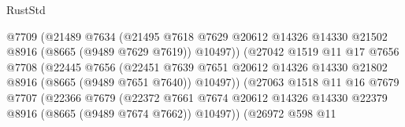 \begin{lexlean}{RustStd}
\begin{coremodule}
                                      @7709
                                      (@21489
                                        @7634
                                        (@21495
                                          @7618
                                          @7629
                                          @20612
                                          @14326
                                          @14330
                                          @21502
                                          @8916
                                          (@8665 (@9489 @7629 @7619))
                                          @10497))
                                      (@27042
                                        @1519
                                        @11
                                        @17
                                        @7656
                                        @7708
                                        (@22445
                                          @7656
                                          (@22451
                                            @7639
                                            @7651
                                            @20612
                                            @14326
                                            @14330
                                            @21802
                                            @8916
                                            (@8665 (@9489 @7651 @7640))
                                            @10497))
                                        (@27063
                                          @1518
                                          @11
                                          @16
                                          @7679
                                          @7707
                                          (@22366
                                            @7679
                                            (@22372
                                              @7661
                                              @7674
                                              @20612
                                              @14326
                                              @14330
                                              @22379
                                              @8916
                                              (@8665 (@9489 @7674 @7662))
                                              @10497))
                                          (@26972
                                            @598
                                            @11

\end{coremodule}
\end{lexlean}

